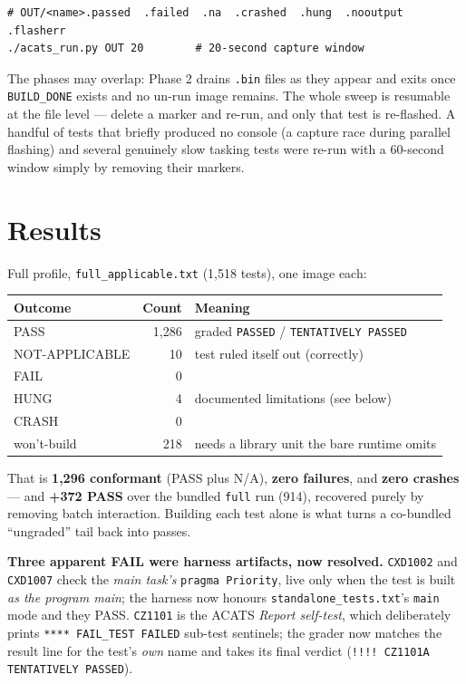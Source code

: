 \begin{lstlisting}[style=sh]
# OUT/<name>.passed  .failed  .na  .crashed  .hung  .nooutput  .flasherr
./acats_run.py OUT 20        # 20-second capture window
\end{lstlisting}

The phases may overlap: Phase 2 drains \texttt{.bin} files as they appear and exits
once \texttt{BUILD\_DONE} exists and no un-run image remains. The whole sweep is
resumable at the file level --- delete a marker and re-run, and only that test is
re-flashed. A handful of tests that briefly produced no console (a capture race during
parallel flashing) and several genuinely slow tasking tests were re-run with a 60-second
window simply by removing their markers.

\section{Results}

Full profile, \texttt{full\_applicable.txt} (1{,}518 tests), one image each:

\begin{longtable}{p{4.5cm} r p{6.5cm}}
\toprule
\textbf{Outcome} & \textbf{Count} & \textbf{Meaning} \\ \midrule
\endhead
PASS                & 1{,}286 & graded \texttt{PASSED} / \texttt{TENTATIVELY PASSED} \\
NOT-APPLICABLE      & 10      & test ruled itself out (correctly) \\
FAIL                & 0       & \\
HUNG                & 4       & documented limitations (see below) \\
CRASH               & 0       & \\
won't-build         & 218     & needs a library unit the bare runtime omits \\
\bottomrule
\end{longtable}

That is \textbf{1{,}296 conformant} (PASS plus N/A), \textbf{zero failures}, and
\textbf{zero crashes} --- and \textbf{+372 PASS} over the bundled \texttt{full} run
(914), recovered purely by removing batch interaction. Building each test alone is what
turns a co-bundled ``ungraded'' tail back into passes.

\textbf{Three apparent FAIL were harness artifacts, now resolved.} \texttt{CXD1002} and
\texttt{CXD1007} check the \emph{main task's} \texttt{pragma Priority}, live only when the
test is built \emph{as the program main}; the harness now honours
\texttt{standalone\_tests.txt}'s \texttt{main} mode and they PASS. \texttt{CZ1101} is the
ACATS \emph{Report self-test}, which deliberately prints \texttt{**** FAIL\_TEST FAILED}
sub-test sentinels; the grader now matches the result line for the test's \emph{own} name
and takes its final verdict (\texttt{!!!! CZ1101A TENTATIVELY PASSED}).

